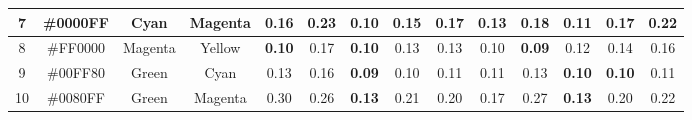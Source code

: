 \begin{table}[!htbp]
{\begin{tabular}{@{}cccccccccccccc@{}}
    \multicolumn{1}{c}{7}       & \multicolumn{1}{c}{\cellcolor[HTML]{0000FF}\#0000FF} & \multicolumn{1}{c|}{Cyan}    & \multicolumn{1}{c|}{Magenta} & \multicolumn{1}{c|}{0.16}                                   & \multicolumn{1}{c|}{0.23}                                  & \multicolumn{1}{c|}{\cellcolor[HTML]{32CB00}\textbf{0.10}} & \multicolumn{1}{c|}{0.15}  & \multicolumn{1}{c||}{0.17}                                  & \multicolumn{1}{c|}{0.13}                                  & \multicolumn{1}{c|}{0.18}                                  & \multicolumn{1}{c|}{\cellcolor[HTML]{32CB00}\textbf{0.11}} & \multicolumn{1}{c|}{0.17}                                  & \multicolumn{1}{c|}{0.22}                                  \\ \midrule
    \multicolumn{1}{c}{8}       & \multicolumn{1}{c}{\cellcolor[HTML]{FF0000}\#FF0000} & \multicolumn{1}{c|}{Magenta} & \multicolumn{1}{c|}{Yellow}  & \multicolumn{1}{c|}{\cellcolor[HTML]{32CB00}\textbf{0.10}}  & \multicolumn{1}{c|}{0.17}                                  & \multicolumn{1}{c|}{\cellcolor[HTML]{32CB00}\textbf{0.10}} & \multicolumn{1}{c|}{0.13}  & \multicolumn{1}{c||}{0.13}                                  & \multicolumn{1}{c|}{0.10}                                  & \multicolumn{1}{c|}{\cellcolor[HTML]{32CB00}\textbf{0.09}} & \multicolumn{1}{c|}{0.12}                                  & \multicolumn{1}{c|}{0.14}                                  & \multicolumn{1}{c|}{0.16}                                  \\ \midrule
    \multicolumn{1}{c}{9}       & \multicolumn{1}{c}{\cellcolor[HTML]{00FF80}\#00FF80} & \multicolumn{1}{c|}{Green}   & \multicolumn{1}{c|}{Cyan}    & \multicolumn{1}{c|}{0.13}                                   & \multicolumn{1}{c|}{0.16}                                  & \multicolumn{1}{c|}{\cellcolor[HTML]{32CB00}\textbf{0.09}} & \multicolumn{1}{c|}{0.10}  & \multicolumn{1}{c||}{0.11}                                  & \multicolumn{1}{c|}{0.11}                                  & \multicolumn{1}{c|}{0.13}                                  & \multicolumn{1}{c|}{\cellcolor[HTML]{32CB00}\textbf{0.10}} & \multicolumn{1}{c|}{\cellcolor[HTML]{32CB00}\textbf{0.10}} & \multicolumn{1}{c|}{0.11}                                  \\ \midrule
    \multicolumn{1}{c}{10}      & \multicolumn{1}{c}{\cellcolor[HTML]{0080FF}\#0080FF} & \multicolumn{1}{c|}{Green}   & \multicolumn{1}{c|}{Magenta} & \multicolumn{1}{c|}{0.30}                                   & \multicolumn{1}{c|}{0.26}                                  & \multicolumn{1}{c|}{\cellcolor[HTML]{32CB00}\textbf{0.13}} & \multicolumn{1}{c|}{0.21}  & \multicolumn{1}{c||}{0.20}                                  & \multicolumn{1}{c|}{0.17}                                  & \multicolumn{1}{c|}{0.27}                                  & \multicolumn{1}{c|}{\cellcolor[HTML]{32CB00}\textbf{0.13}} & \multicolumn{1}{c|}{0.20}                                  & \multicolumn{1}{c|}{0.22}                                  \\ \midrule

\end{tabular}}
\end{table}
